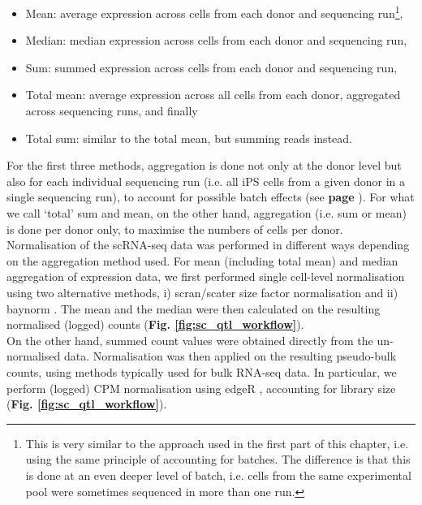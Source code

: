 \begin{itemize}
    \item Mean: average expression across cells from each donor and sequencing run\footnote{This is very similar to the approach used in the first part of this chapter, i.e. using the same principle of accounting for batches.
    The difference is that this is done at an even deeper level of batch, i.e. cells from the same experimental pool were sometimes sequenced in more than one run.},
    \item Median: median expression across cells from each donor and sequencing run,
    \item Sum: summed expression across cells from each donor and sequencing run,
    \item Total mean: average expression across all cells from each donor, aggregated across sequencing runs, and finally
    \item Total sum: similar to the total mean, but summing reads instead.
\end{itemize}


For the first three methods, aggregation is done not only at the donor level but also for each individual sequencing run (i.e. all iPS cells from a given donor in a single sequencing run), to account for possible batch effects (see \textbf{page \pageref{sec:sc_ipsc_eqtl}}).
For what we call `total' sum and mean, on the other hand, aggregation (i.e. sum or mean) is done per donor only, to maximise the numbers of cells per donor.\\

Normalisation of the scRNA-seq data was performed in different ways depending on the aggregation method used.
For mean (including total mean) and median aggregation of expression data, we first performed single cell-level normalisation using two alternative methods, i) scran/scater \cite{mccarthy2017scater} size factor normalisation and ii) baynorm \cite{tang2020baynorm}.
The mean and the median were then calculated on the resulting normalised (logged) counts (\textbf{Fig. \ref{fig:sc_qtl_workflow}}). \\

On the other hand, summed count values were obtained directly from the un-normalised data.
Normalisation was then applied on the resulting pseudo-bulk counts, using methods typically used for bulk RNA-seq data.
In particular, we perform (logged) CPM normalisation using edgeR \cite{robinson2010edger}, accounting for library size (\textbf{Fig. \ref{fig:sc_qtl_workflow}}).\\

